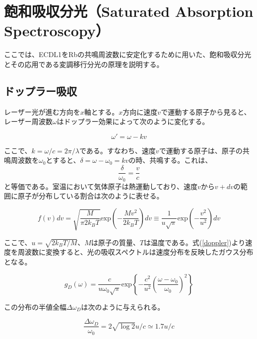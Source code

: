 \documentclass[dvipdfmx]{jsreport}
\begin{document}
\clearpage
\section{飽和吸収分光（Saturated Absorption Spectroscopy）}
ここでは、ECDL1をRbの共鳴周波数に安定化するために用いた、飽和吸収分光とその応用である変調移行分光の原理を説明する。
\subsection{ドップラー吸収}
レーザー光が進む方向を$x$軸とする。$x$方向に速度$v$で運動する原子から見ると、レーザー周波数$\omega$はドップラー効果によって次のように変化する。

\begin{equation}
\omega' = \omega - kv
\end{equation}

ここで、$k = \omega / c = 2\pi / \lambda$である。すなわち、速度$v$で運動する原子は、原子の共鳴周波数を$\omega_0$とすると、$\delta = \omega - \omega_0 = kv$の時、共鳴する。これは、
\begin{equation}
\label{doppler}
    \frac{\delta}{\omega_0} = \frac{v}{c}
\end{equation}
と等価である。室温において気体原子は熱運動しており、速度$v$から$v + dv$の範囲に原子が分布している割合は次のように表せる。

\begin{equation}
    f(v)dv 
    = \sqrt{\frac{M}{\pi2k_BT}}\text{exp}\left( - \frac{Mv^2}{2k_BT} \right)dv
    \equiv \frac{1}{u\sqrt{\pi}}\text{exp} \left( - \frac{v^2}{u^2} \right)dv
\end{equation}

ここで、$u=\sqrt{2k_BT/M}$、$M$は原子の質量、$T$は温度である。式(\ref{doppler})より速度を周波数に変換すると、光の吸収スペクトルは速度分布を反映したガウス分布となる。

\begin{equation}
    g_D(\omega) = 
    \frac{c}{u\omega_0\sqrt{\pi}}
    \text{exp}
    \left\{
        -\frac{c^2}{u^2}
        \left(
            \frac{\omega - \omega_0}{\omega_0}
        \right) ^2
    \right\}
\end{equation}

この分布の半値全幅$\Delta\omega_D$は次のように与えられる。

\begin{equation}
\frac{\Delta\omega_D}{\omega_0} = 2\sqrt{\log2}u/c \simeq 1.7u/c
\end{equation}
\end{document}
